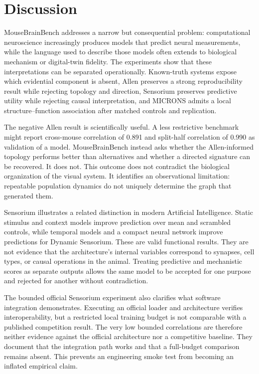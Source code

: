 \section{Discussion}

MouseBrainBench addresses a narrow but consequential problem: computational
neuroscience increasingly produces models that predict neural measurements,
while the language used to describe those models often extends to biological
mechanism or digital-twin fidelity. The experiments show that these
interpretations can be separated operationally. Known-truth systems expose
which evidential component is absent, Allen preserves a strong reproducibility
result while rejecting topology and direction, Sensorium preserves predictive
utility while rejecting causal interpretation, and MICRONS admits a local
structure--function association after matched controls and replication.

The negative Allen result is scientifically useful. A less restrictive
benchmark might report cross-mouse correlation of 0.891 and split-half
correlation of 0.990 as validation of a model. MouseBrainBench instead asks
whether the Allen-informed topology performs better than alternatives and
whether a directed signature can be recovered. It does not. This outcome does
not contradict the biological organization of the visual system. It identifies
an observational limitation: repeatable population dynamics do not uniquely
determine the graph that generated them.

Sensorium illustrates a related distinction in modern Artificial Intelligence.
Static stimulus and context models improve prediction over mean and scrambled
controls, while temporal models and a compact neural network improve predictions
for Dynamic Sensorium. These are valid functional results. They are not evidence
that the architecture's internal variables correspond to synapses, cell types,
or causal operations in the animal. Treating predictive and mechanistic scores
as separate outputs allows the same model to be accepted for one purpose and
rejected for another without contradiction.

The bounded official Sensorium experiment also clarifies what software
integration demonstrates. Executing an official loader and architecture verifies
interoperability, but a restricted local training budget is not comparable with
a published competition result. The very low bounded correlations are therefore
neither evidence against the official architecture nor a competitive baseline.
They document that the integration path works and that a full-budget comparison
remains absent. This prevents an engineering smoke test from becoming an
inflated empirical claim.

